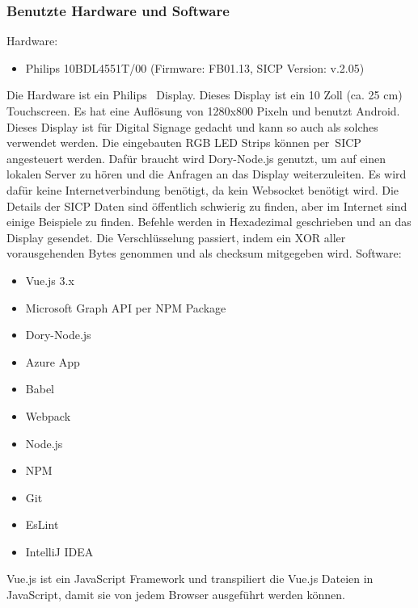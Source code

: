 \subsubsection{Benutzte Hardware und Software}
Hardware:
\begin{itemize}
    \item Philips 10BDL4551T/00 (Firmware: FB01.13, SICP Version: v.2.05)
\end{itemize}
\newline
Die Hardware ist ein Philips~\cite{10BDL4551T/00} Display.
Dieses Display ist ein 10 Zoll (ca. 25 cm) Touchscreen.
Es hat eine Auflösung von 1280x800 Pixeln und benutzt Android.
Dieses Display ist für Digital Signage gedacht und kann so auch als solches verwendet werden.
Die eingebauten RGB LED Strips können per~\gls{SICP} angesteuert werden.
Dafür braucht wird Dory-Node.js genutzt, um auf einen lokalen Server zu hören und die Anfragen an das Display weiterzuleiten.
Es wird dafür keine Internetverbindung benötigt, da kein Websocket benötigt wird.
Die Details der SICP Daten sind öffentlich schwierig zu finden, aber im Internet sind einige Beispiele zu finden.
Befehle werden in Hexadezimal geschrieben und an das Display gesendet.
Die Verschlüsselung passiert, indem ein XOR aller vorausgehenden Bytes genommen und als checksum mitgegeben wird.
\newline
\newline
Software:
\begin{itemize}
    \item Vue.js 3.x
    \item Microsoft Graph API per NPM Package
    \item Dory-Node.js
    \item Azure App
    \item Babel
    \item Webpack
    \item Node.js
    \item NPM
    \item Git
    \item EsLint
    \item IntelliJ IDEA
\end{itemize}
\newline
Vue.js ist ein JavaScript Framework und transpiliert die Vue.js Dateien in JavaScript, damit sie von jedem Browser ausgeführt werden können.
